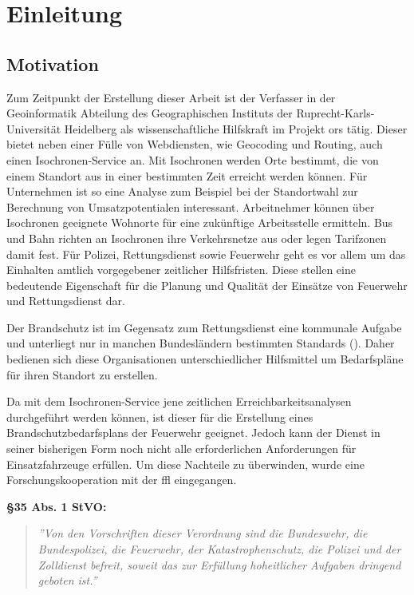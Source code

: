 \documentclass[12pt,a4paper]{article}
\begin{document}
\newpage
\listoftables

\printglossary[type=\acronymtype, title=Abkürzungsverzeichnis, toctitle=Abkürzungsverzeichnis]

\newpage
{}
\section{Einleitung}

\subsection{Motivation}
Zum Zeitpunkt der Erstellung dieser Arbeit ist der Verfasser in der Geoinformatik Abteilung des Geographischen Instituts der Ruprecht-Karls-Universität Heidelberg als wissenschaftliche Hilfskraft im Projekt \gls{ors} tätig. Dieser bietet neben einer Fülle von Webdiensten, wie Geocoding und Routing, auch einen Isochronen-Service an. Mit Isochronen werden Orte bestimmt, die von einem Standort aus in einer bestimmten Zeit erreicht werden können. Für Unternehmen ist so eine Analyse zum Beispiel bei der Standortwahl zur Berechnung von Umsatzpotentialen interessant. Arbeitnehmer können über Isochronen geeignete Wohnorte für eine zukünftige Arbeitsstelle ermitteln. Bus und Bahn richten an Isochronen ihre Verkehrsnetze aus oder legen Tarifzonen damit fest.
Für Polizei, Rettungsdienst sowie Feuerwehr geht es vor allem um das Einhalten amtlich vorgegebener zeitlicher Hilfsfristen. Diese stellen eine bedeutende Eigenschaft für die Planung und Qualität der Einsätze von Feuerwehr und Rettungsdienst dar.\par
Der Brandschutz ist im Gegensatz zum Rettungsdienst eine kommunale Aufgabe und unterliegt nur in manchen Bundesländern bestimmten Standards (\cite{bedarfsplan}). Daher bedienen sich diese Organisationen unterschiedlicher Hilfsmittel um Bedarfspläne für ihren Standort zu erstellen.
\medskip

Da mit dem Isochronen-Service jene zeitlichen Erreichbarkeitsanalysen durchgeführt werden können, ist dieser für die Erstellung eines Brandschutzbedarfsplans der Feuerwehr geeignet. Jedoch kann der Dienst in seiner bisherigen Form noch nicht alle erforderlichen Anforderungen für Einsatzfahrzeuge erfüllen. Um diese Nachteile zu überwinden, wurde eine Forschungskooperation mit der \gls{ffl} eingegangen.
\vspace{1.2cm}

\textbf{§35 Abs. 1 StVO:}
\begin{quotation}
\label{cit:STVO}
{\itshape\rmfamily ''Von den Vorschriften dieser Verordnung sind die Bundeswehr, die Bundespolizei, die Feuerwehr, der Katastrophenschutz, die Polizei und der Zolldienst befreit, soweit das zur Erfüllung hoheitlicher Aufgaben dringend geboten ist.''}
\end{quotation}
\end{document}
